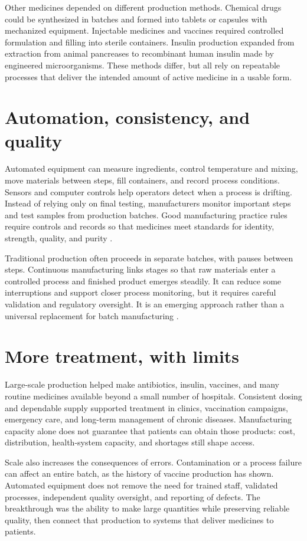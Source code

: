 \documentclass[12pt,oneside]{book}
\begin{document}
Other medicines depended on different production methods. Chemical drugs
could be synthesized in batches and formed into tablets or capsules with
mechanized equipment. Injectable medicines and vaccines required controlled
formulation and filling into sterile containers. Insulin production expanded
from extraction from animal pancreases to recombinant human insulin made by
engineered microorganisms. These methods differ, but all rely on repeatable
processes that deliver the intended amount of active medicine in a usable
form.

\section{Automation, consistency, and quality}
Automated equipment can measure ingredients, control temperature and mixing,
move materials between steps, fill containers, and record process conditions.
Sensors and computer controls help operators detect when a process is
drifting. Instead of relying only on final testing, manufacturers monitor
important steps and test samples from production batches. Good manufacturing
practice rules require controls and records so that medicines meet standards
for identity, strength, quality, and purity \cite{fdaCGMP}.

Traditional production often proceeds in separate batches, with pauses
between steps. Continuous manufacturing links stages so that raw materials
enter a controlled process and finished product emerges steadily. It can
reduce some interruptions and support closer process monitoring, but it
requires careful validation and regulatory oversight. It is an emerging
approach rather than a universal replacement for batch manufacturing
\cite{fdaContinuousManufacturing}.

\section{More treatment, with limits}
Large-scale production helped make antibiotics, insulin, vaccines, and many
routine medicines available beyond a small number of hospitals. Consistent
dosing and dependable supply supported treatment in clinics, vaccination
campaigns, emergency care, and long-term management of chronic diseases.
Manufacturing capacity alone does not guarantee that patients can obtain
those products: cost, distribution, health-system capacity, and shortages
still shape access.

Scale also increases the consequences of errors. Contamination or a process
failure can affect an entire batch, as the history of vaccine production has
shown. Automated equipment does not remove the need for trained staff,
validated processes, independent quality oversight, and reporting of defects.
The breakthrough was the ability to make large quantities while preserving
reliable quality, then connect that production to systems that deliver
medicines to patients.
\end{document}
